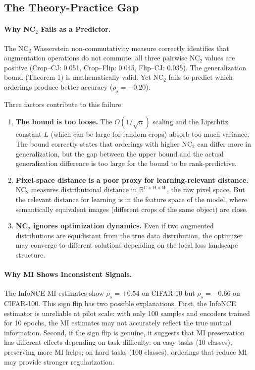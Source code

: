 \documentclass{article}
\begin{document}
\subsection{The Theory-Practice Gap}

\paragraph{Why NC$_2$ Fails as a Predictor.}
The NC$_2$ Wasserstein non-commutativity measure correctly identifies that augmentation operations do not commute: all three pairwise NC$_2$ values are positive (Crop--CJ: 0.051, Crop--Flip: 0.045, Flip--CJ: 0.035). The generalization bound (Theorem 1) is mathematically valid. Yet NC$_2$ fails to predict which orderings produce better accuracy ($\rho_s = -0.20$).

Three factors contribute to this failure:
\begin{enumerate}
\item \textbf{The bound is too loose.} The $O(1/\sqrt{n})$ scaling and the Lipschitz constant $L$ (which can be large for random crops) absorb too much variance. The bound correctly states that orderings with higher NC$_2$ can differ more in generalization, but the gap between the upper bound and the actual generalization difference is too large for the bound to be rank-predictive.
\item \textbf{Pixel-space distance is a poor proxy for learning-relevant distance.} NC$_2$ measures distributional distance in $\mathbb{R}^{C \times H \times W}$, the raw pixel space. But the relevant distance for learning is in the feature space of the model, where semantically equivalent images (different crops of the same object) are close.
\item \textbf{NC$_2$ ignores optimization dynamics.} Even if two augmented distributions are equidistant from the true data distribution, the optimizer may converge to different solutions depending on the local loss landscape structure.
\end{enumerate}

\paragraph{Why MI Shows Inconsistent Signals.}
The InfoNCE MI estimates show $\rho_s = +0.54$ on CIFAR-10 but $\rho_s = -0.66$ on CIFAR-100. This sign flip has two possible explanations. First, the InfoNCE estimator is unreliable at pilot scale: with only 100 samples and encoders trained for 10 epochs, the MI estimates may not accurately reflect the true mutual information. Second, if the sign flip is genuine, it suggests that MI preservation has different effects depending on task difficulty: on easy tasks (10 classes), preserving more MI helps; on hard tasks (100 classes), orderings that reduce MI may provide stronger regularization.
\end{document}
